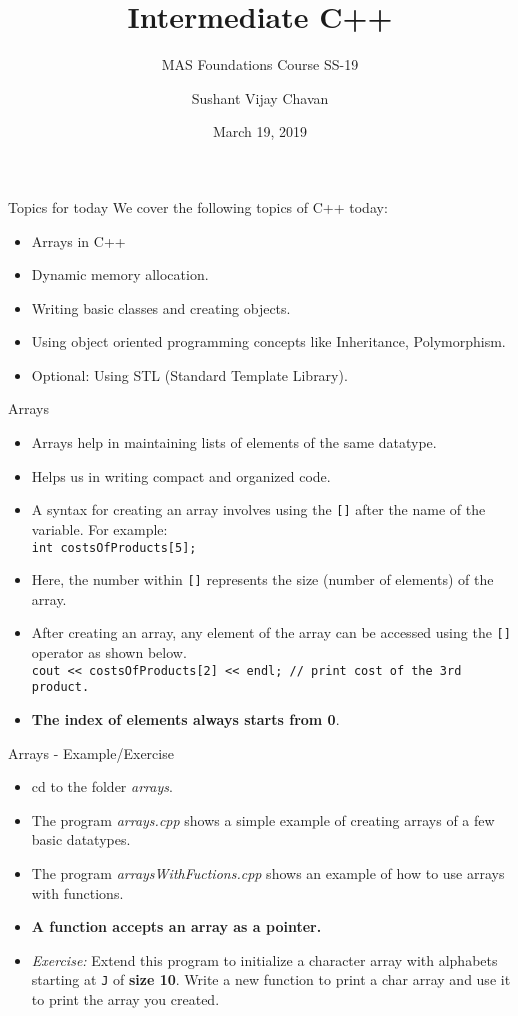 \documentclass[aspectratio=169]{beamer}
\author[Chavan]{Sushant Vijay Chavan}
\title{Intermediate C++}
\subtitle{MAS Foundations Course SS-19}
\institute[HBRS]{Hochschule Bonn-Rhein-Sieg}
\date{March 19, 2019}
\begin{document}
{
\begin{frame}
\titlepage
\end{frame}
}

\begin{frame}{Topics for today}
	We cover the following topics of C++ today:
		\begin{itemize}
			\item Arrays in C++
			\item Dynamic memory allocation.
			\item Writing basic classes and creating objects.
			\item Using object oriented programming concepts like Inheritance, Polymorphism.
			\item Optional: Using STL (Standard Template Library).
		\end{itemize}
\end{frame}

\begin{frame}[fragile]{Arrays}
	\begin{itemize}
		\item Arrays help in maintaining lists of elements of the same datatype.
		\item Helps us in writing compact and organized code.
		\item A syntax for creating an array involves using the \verb|[]| after the name of the variable. For example: \\ \verb|int costsOfProducts[5];|
		\item Here, the number within \verb|[]| represents the size (number of elements) of the array.
		\item After creating an array, any element of the array can be accessed using the \verb|[]| operator as shown below. \\ \verb|cout << costsOfProducts[2] << endl; // print cost of the 3rd product.|
		\item  \textbf{The index of elements always starts from 0}.
	\end{itemize}
\end{frame}

\begin{frame}[fragile]{Arrays - Example/Exercise}
	\begin{itemize}
		\item cd to the folder \textit{arrays}.
		\item The program \textit{arrays.cpp} shows a simple example of creating arrays of a few basic datatypes.
		\item The program \textit{arraysWithFuctions.cpp} shows an example of how to use arrays with functions.
		\item \textbf{A function accepts an array as a pointer.}
		\item \textit{Exercise:} Extend this program to initialize a character array with alphabets starting at \verb|J| of \textbf{size 10}. Write a new function to print a char array and use it to print the array you created.
	\end{itemize}
\end{frame}
\end{document}
